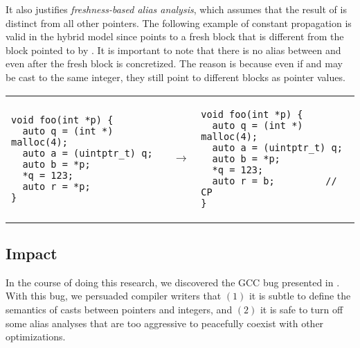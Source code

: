 It also justifies %
\textit{freshness-based alias analysis}, which assumes that the result of
 is distinct from all other pointers.  The 
following example of constant propagation is valid in the
hybrid model since  points to a fresh block that
is different from the block pointed to by .
It is important to note that there is no alias
between  and  even after
the fresh block is concretized. The reason is because
even if  and  may be cast to the same integer,
they still point to different blocks as pointer values.
\begin{center}
\begin{tabular}{@{}l@{}l@{~~}l}
\small
\begin{minipage}{0.45\textwidth}
\begin{verbatim}
void foo(int *p) {
  auto q = (int *) malloc(4);
  auto a = (uintptr_t) q;
  auto b = *p;
  *q = 123;
  auto r = *p;
}
\end{verbatim}
\end{minipage}
&
$~\rightarrow$
&
\small
\begin{minipage}{0.45\textwidth}
\begin{verbatim}
void foo(int *p) {
  auto q = (int *) malloc(4);
  auto a = (uintptr_t) q;
  auto b = *p;
  *q = 123;
  auto r = b;         // CP
}
\end{verbatim}
\end{minipage}
\end{tabular}
\end{center}




\subsection{Impact}

In the course of doing this research, we discovered the GCC bug presented in
.  With this bug, we persuaded compiler writers that $(1)$ it is
subtle to define the semantics of casts between pointers and integers, and $(2)$ it is safe to turn
off some alias analyses that are too aggressive to peacefully coexist with other optimizations.

